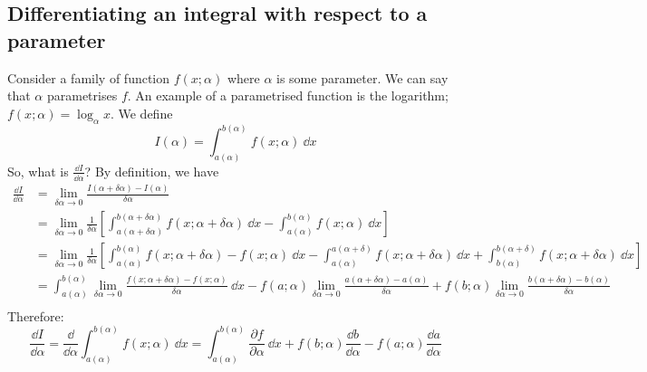 \subsection{Differentiating an integral with respect to a parameter}
Consider a family of function \(f(x; \alpha)\) where \(\alpha\) is some parameter.
We can say that \(\alpha\) parametrises \(f\).
An example of a parametrised function is the logarithm; \(f(x; \alpha) = \log_\alpha x\).
We define
\[
	I(\alpha) = \int_{a(\alpha)}^{b(\alpha)} f(x; \alpha) \ \dd{x}
\]
So, what is \(\frac{\dd{I}}{\dd \alpha}\)?
By definition, we have
\begin{align*}
	\frac{\dd{I}}{\dd \alpha} & = \lim_{\delta \alpha \to 0} \frac{I(\alpha + \delta \alpha) - I(\alpha)}{\delta \alpha}                                                                                                                                                                                                                                                  \\
	                          & = \lim_{\delta \alpha \to 0} \frac{1}{\delta\alpha} \left[ \int_{a(\alpha + \delta\alpha)}^{b(\alpha + \delta\alpha)} f(x; \alpha + \delta\alpha)\ \dd{x} - \int_{a(\alpha)}^{b(\alpha)} f(x; \alpha)\ \dd{x} \right]                                                                                                                     \\
	                          & = \lim_{\delta \alpha \to 0} \frac{1}{\delta\alpha} \left[ \int_{a(\alpha)}^{b(\alpha)} f(x; \alpha + \delta\alpha) - f(x; \alpha)\ \dd{x} - \int_{a(\alpha)}^{a(\alpha + \delta)} f(x; \alpha + \delta \alpha)\ \dd{x} + \int_{b(\alpha)}^{b(\alpha + \delta)} f(x; \alpha + \delta \alpha)\ \dd{x} \right]                              \\
	                          & = \int_{a(\alpha)}^{b(\alpha)} \lim_{\delta \alpha \to 0} \frac{f(x; \alpha + \delta\alpha) - f(x; \alpha)}{\delta\alpha}\ \dd{x} - f(a; \alpha) \lim_{\delta \alpha \to 0} \frac{a(\alpha + \delta\alpha) - a(\alpha)}{\delta\alpha} + f(b; \alpha) \lim_{\delta \alpha \to 0} \frac{b(\alpha + \delta\alpha) - b(\alpha)}{\delta\alpha} \\
\end{align*}
Therefore:
\[
	\frac{\dd{I}}{\dd \alpha} = \frac{\dd}{\dd \alpha} \int_{a(\alpha)}^{b(\alpha)} f(x; \alpha) \ \dd{x} = \int_{a(\alpha)}^{b(\alpha)} \frac{\partial f}{\partial \alpha} \ \dd{x} + f(b; \alpha) \frac{\dd{b}}{\dd \alpha} - f(a; \alpha) \frac{\dd{a}}{\dd \alpha}
\]

